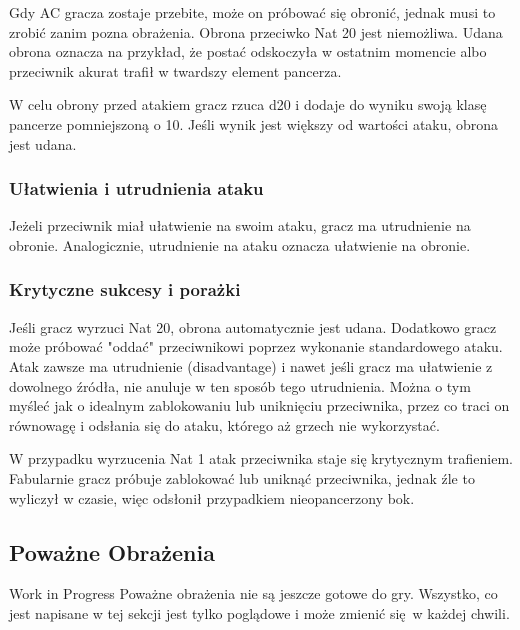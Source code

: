 Gdy AC gracza zostaje przebite, może on próbować się obronić, jednak musi to
zrobić zanim pozna obrażenia. Obrona przeciwko Nat 20 jest niemożliwa. Udana
obrona oznacza na przykład, że postać odskoczyła  w ostatnim momencie albo
przeciwnik akurat trafił w twardszy element pancerza.

W celu obrony przed atakiem gracz rzuca d20 i dodaje do wyniku swoją klasę
pancerze pomniejszoną o 10. Jeśli wynik jest większy od wartości ataku, obrona
jest udana.

\subsubsection{Ułatwienia i utrudnienia ataku}
Jeżeli przeciwnik miał ułatwienie na swoim ataku, gracz ma utrudnienie na
obronie. Analogicznie, utrudnienie na ataku oznacza ułatwienie na obronie.

\subsubsection{Krytyczne sukcesy i porażki}
Jeśli gracz wyrzuci Nat 20, obrona automatycznie jest udana. Dodatkowo gracz
może próbować "oddać" przeciwnikowi poprzez wykonanie standardowego ataku. Atak
zawsze ma utrudnienie (disadvantage) i nawet jeśli gracz ma ułatwienie z
dowolnego źródła, nie anuluje w ten sposób tego utrudnienia. Można o tym myśleć
jak o idealnym zablokowaniu lub uniknięciu przeciwnika, przez co traci on
równowagę i odsłania się do ataku, którego aż grzech nie wykorzystać.

W przypadku wyrzucenia Nat 1 atak przeciwnika staje się krytycznym trafieniem.
Fabularnie gracz próbuje zablokować lub uniknąć przeciwnika, jednak źle to
wyliczył w czasie, więc odsłonił przypadkiem nieopancerzony bok.

\subsection{Poważne Obrażenia}

\begin{boxed}{Work in Progress}
  Poważne obrażenia nie są jeszcze gotowe do gry. Wszystko, co jest napisane w tej
  sekcji jest tylko poglądowe i może zmienić się w każdej chwili.
\end{boxed}

